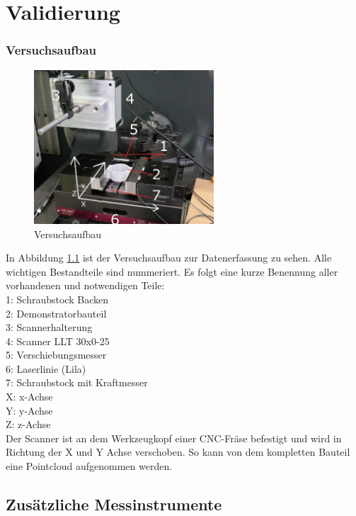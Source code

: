 
\chapter{Validierung}

\subsection{Versuchsaufbau}

\begin{figure}
    \includegraphics[width=0.6\textwidth]{images/versuchsaufbau_foto.png.JPG}
    \caption{Versuchsaufbau}
    \label{fig:versuchsaufbau}
\end{figure}

In Abbildung \ref{fig:versuchsaufbau} ist der Versuchsaufbau zur Datenerfassung 
zu sehen. Alle wichtigen Bestandteile sind nummeriert. Es folgt eine kurze Benennung
aller vorhandenen und notwendigen Teile:\\
1: Schraubstock Backen\\
2: Demonstratorbauteil\\
3: Scannerhalterung\\
4: Scanner LLT 30x0-25\\
5: Verschiebungsmesser\\
6: Laserlinie (Lila)\\
7: Schraubstock mit Kraftmesser\\
X: x-Achse\\
Y: y-Achse\\
Z: z-Achse\\

Der Scanner ist an dem Werkzeugkopf einer CNC-Fräse befestigt und wird 
in Richtung der X und Y Achse verschoben. So kann von dem kompletten Bauteil eine 
Pointcloud aufgenommen werden.

\section{Zusätzliche Messinstrumente}

